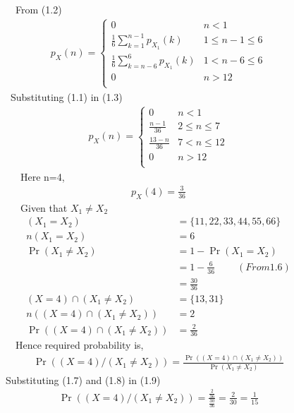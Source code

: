 \documentclass[journal,12pt,twocolumn]{IEEEtran}
\providecommand{\pr}[1]{\ensuremath{\Pr\left(#1\right)}}
\theoremstyle{remark}
\begin{document}
\ \ \ \ \ \ \ From (1.2)
\begin{align*}
  p_X(n) =
  \begin{cases}
  0 & n < 1 \\
  \frac{1}{6}\sum_{k=1}^{n-1}p_{X_1}(k) & 1 \leq n-1 \leq 6 \\
  \frac{1}{6}\sum_{k=n-6}^{6}p_{X_1}(k) & 1 < n-6 \leq 6 \\
  0 & n > 12 \\
  \end{cases}
  \tag{1.3}
  \end{align*}
  \ \ \ \ \ \ Substituting (1.1) in (1.3)
  \begin{align*}
  p_X(n) =
  \begin{cases}
  0 & n < 1 \\
  \frac{n-1}{36} & 2 \leq n \leq 7 \\
  \frac{13-n}{36} & 7 < n \leq 12 \\
  0 & n > 12 \\
  \end{cases}
  \tag{1.4}
  \end{align*}
  \ \ \ \ \ \ \ \ Here n=4,
  \begin{align*}
  p_X(4)=\frac{3}{36} \tag{1.5}
  \end{align*}
  \ \ \ \ \ \ \ \ Given that $ X_1 \neq X_2 $
\begin{align*}
  (X_1=X_2)&=\{11,22,33,44,55,66\} \\
  n(X_1=X_2)&=6 \tag{1.6} \\
\pr{X_1 \neq X_2}&=1-\pr{X_1=X_2} \\
&=1-\frac{6}{36} \ \ \ \ \ \ \ \ \ \ (From 1.6) \\
&=\frac{30}{36} \tag{1.7} \\
{(X=4)} \cap (X_1 \neq X_2)&=\{13,31\} \\
n({(X=4)} \cap (X_1 \neq X_2))&=2 \\ 
\pr{(X=4) \cap (X_1 \neq X_2)}&=\frac{2}{36} \tag{1.8}
\end{align*}
\ \ \ \ \ \ \ Hence required probability is,
\begin{align*}
\pr{(X=4)/(X_1 \neq X_2)}=\frac{\pr{(X=4) \cap (X_1 \neq X_2)}}{\pr{X_1 \neq X_2}}\tag{1.9}
\end{align*}
\ \ \ \ \ Substituting (1.7) and (1.8) in (1.9) 
\begin{align*}
\pr{(X=4)/(X_1 \neq X_2)}=\frac{\frac{2}{36}}{\frac{30}{36}}=\frac{2}{30}=\frac{1}{15}
\end{align*}
\end{document}
